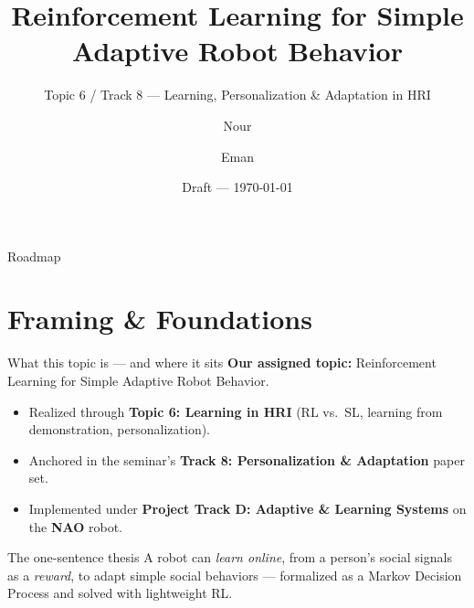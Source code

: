 \documentclass[aspectratio=169,10pt]{beamer}
\title{Reinforcement Learning for Simple Adaptive Robot Behavior}
\subtitle{Topic 6 / Track 8 --- Learning, Personalization \& Adaptation in HRI}
\author{Nour \and Eman}
\institute{German International University (GIU) \\ Interactive \& Social AI for Humanoid Robots}
\date{Draft --- \today}
\begin{document}
\maketitle

\begin{frame}{Roadmap}
  \tableofcontents
\end{frame}

\section{Framing \& Foundations}

\begin{frame}{What this topic is --- and where it sits}
  \textbf{Our assigned topic:} \alert{Reinforcement Learning for Simple Adaptive Robot Behavior.}
  \vspace{0.6em}
  \begin{itemize}
    \item Realized through \textbf{Topic 6: Learning in HRI} (RL vs.\ SL, learning from demonstration, personalization).
    \item Anchored in the seminar's \textbf{Track 8: Personalization \& Adaptation} paper set.
    \item Implemented under \textbf{Project Track D: Adaptive \& Learning Systems} on the \textbf{NAO} robot.
  \end{itemize}
  \vspace{0.6em}
  \begin{block}{The one-sentence thesis}
    A robot can \emph{learn online}, from a person's social signals as a \emph{reward}, to adapt simple social behaviors --- formalized as a Markov Decision Process and solved with lightweight RL.
  \end{block}
\end{frame}
\end{document}
